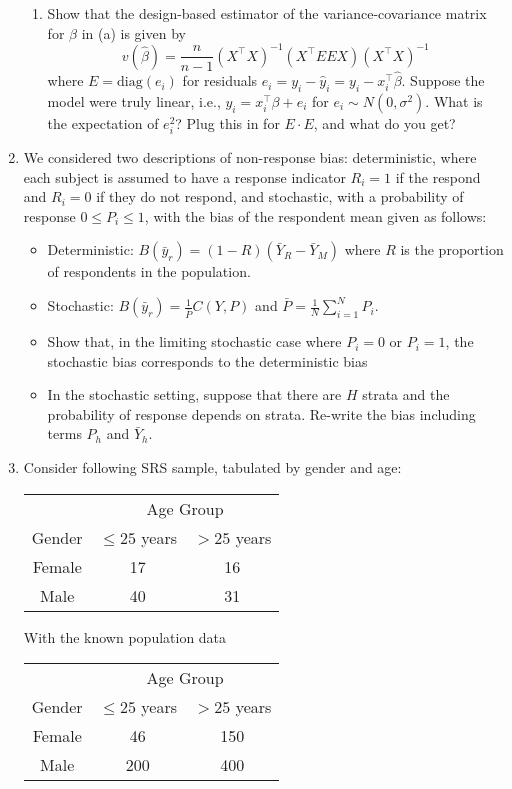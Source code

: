 \documentclass[12pt]{article}
\begin{document}
\begin{enumerate}
\begin{enumerate}
	\item Show that the design-based estimator of the variance-covariance matrix for $\hat \beta$ in (a) is given by
	$$
	v(\hat \beta) = \frac{n}{n-1} \left( X^\top X \right)^{-1} \left( X^\top E E X \right) \left( X^\top X \right)^{-1}
	$$
	where $E = \text{diag} (e_i)$ for residuals $e_i =  y_i - \hat y_i = y_i - x_i^\top \hat \beta$. Suppose the model were truly linear, i.e., $y_i = x_i^\top \beta + e_i$ for $e_i \sim N(0,\sigma^2)$.  What is the expectation of $e_i^2$?  Plug this in for $E \cdot E$, and what do you get?
\end{enumerate}
\newpage
\item We considered two descriptions of non-response bias: deterministic, where
each subject is assumed to have a response indicator $R_i=1$ if the respond and
$R_i = 0$ if they do not respond, and stochastic, with a probability of response $0 \leq P_i \leq 1$, with the bias of the respondent mean given as follows:
\begin{itemize}
	\item Deterministic: $B(\bar y_r) = (1-R) (\bar Y_R - \bar Y_M)$ where $R$ is the proportion of respondents in the population.
	\item Stochastic: $B( \bar y_r ) = \frac{1}{\bar P} C(Y, P)$ and $\bar P = \frac{1}{N} \sum_{i=1}^N P_i$.
	\item Show that, in the limiting stochastic case where $P_i = 0$ or $P_i = 1$, the stochastic bias corresponds to the deterministic bias
	\item In the stochastic setting, suppose that there are $H$ strata and the probability of response depends on strata.  Re-write the bias including terms $P_h$ and $\bar Y_h$.
\end{itemize}
\newpage
\item Consider following SRS sample, tabulated by gender and age:
\begin{table}[!th]
\centering
\begin{tabular}{c c c}
& \multicolumn{2}{c}{Age Group} \\ \cline{2-3}
Gender & $\leq 25$ years & $> 25$ years \\ \hline
Female & 17 & 16 \\
Male & 40 & 31 \\ \hline
\end{tabular}
\end{table}

With the known population data

\begin{table}[!th]
\centering
\begin{tabular}{c c c}
& \multicolumn{2}{c}{Age Group} \\ \cline{2-3}
Gender & $\leq 25$ years & $> 25$ years \\ \hline
Female & 46 & 150 \\
Male & 200 & 400 \\ \hline
\end{tabular}
\end{table}


\end{enumerate}
\end{document}
